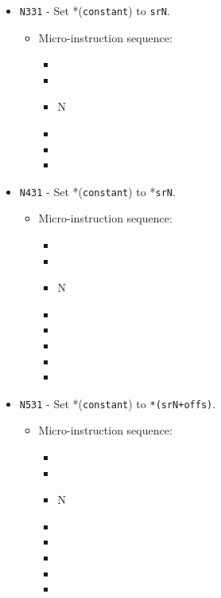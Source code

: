 \documentclass{article}
\begin{document}
\begin{itemize}
    \item \Verb|N331| - Set *(\Verb|constant|) to \Verb|srN|.
    \begin{itemize}
        \item Micro-instruction sequence:
        \begin{itemize}
            \item \pkptroutinc
            \item \holddataaddr
            \item \regtodata N
            \item \writeRAM
            \item \incrementpk
            \item \done
        \end{itemize}
    \end{itemize}

    \item \Verb|N431| - Set *(\Verb|constant|) to *\Verb|srN|.
    \begin{itemize}
        \item Micro-instruction sequence:
        \begin{itemize}
            \item \pkptroutinc
            \item \datatotmpa
            \item \regptodata N
            \item \holddata
            \item \tmpatoaddr
            \item \writeRAM
            \item \incrementpk
            \item \done
        \end{itemize}
    \end{itemize}
    
    \item \Verb|N531| - Set *(\Verb|constant|) to \Verb|*(srN+offs)|.
    \begin{itemize}
        \item Micro-instruction sequence:
        \begin{itemize}
            \item \pkptroutinc
            \item \datatotmpa
            \item \regptodata N
            \item \holddata
            \item \tmpatoaddr
            \item \writeRAM
            \item \incrementpk
            \item \done
        \end{itemize}
    \end{itemize}
    

\end{itemize}
\end{document}
